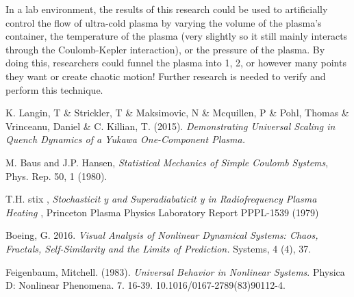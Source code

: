 \documentclass{article}
\begin{document}
In a lab environment, the results of this research could be used to artificially control the flow of ultra-cold plasma by varying the volume of the plasma's container, the temperature of the plasma (very slightly so it still mainly interacts through the Coulomb-Kepler interaction), or the pressure of the plasma. By doing this, researchers could funnel the plasma into 1, 2, or however many points they want or create chaotic motion! Further research is needed to verify and perform this technique.
\begin{thebibliography}{9}
K. Langin, T \& Strickler, T \& Maksimovic, N \& Mcquillen, P \& Pohl, Thomas \& Vrinceanu, Daniel \& C. Killian, T. (2015). 
\textit{Demonstrating Universal Scaling in Quench Dynamics of a Yukawa One-Component Plasma.}

M. Baus and J.P. Hansen, \textit{Statistical Mechanics of Simple Coulomb Systems}, Phys. Rep. 50, 1 (1980).

T.H. stix , \textit{Stochasticit y and Superadiabaticit y in Radiofrequency Plasma
Heating} , Princeton Plasma Physics Laboratory Report PPPL-1539 (1979) 

Boeing, G. 2016. \textit{Visual Analysis of Nonlinear Dynamical Systems: Chaos, Fractals, Self-Similarity and the Limits of Prediction.} Systems, 4 (4), 37.

Feigenbaum, Mitchell. (1983). \textit{Universal Behavior in Nonlinear Systems}. Physica D: Nonlinear Phenomena. 7. 16-39. 10.1016/0167-2789(83)90112-4. 

\end{thebibliography}
\end{document}
